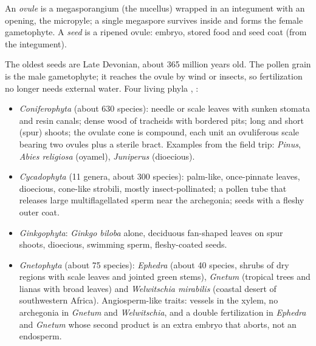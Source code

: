\begin{definition}
\label{definition-ovule}
An \emph{ovule} is a megasporangium (the
nucellus) wrapped in an integument with an
opening, the micropyle; a single megaspore
survives inside and forms the female
gametophyte. A \emph{seed} is a ripened
ovule: embryo, stored food and seed coat
(from the integument).
\end{definition}

The oldest seeds are Late Devonian, about
365 million years old. The pollen grain is
the male gametophyte; it reaches the ovule
by wind or insects, so fertilization no
longer needs external water. Four living
phyla \cite[Chapter 18]{evert2013raven},
\cite[Chapter 12]{singh2010plant}:
\begin{itemize}
\item \emph{Coniferophyta} (about 630
species): needle or scale leaves with sunken
stomata and resin canals; dense wood of
tracheids with bordered pits; long and
short (spur) shoots; the ovulate cone is
compound, each unit an ovuliferous scale
bearing two ovules plus a sterile bract.
Examples from the field trip:
\emph{Pinus}, \emph{Abies religiosa}
(oyamel), \emph{Juniperus} (dioecious).
\item \emph{Cycadophyta} (11 genera, about
300 species): palm-like, once-pinnate
leaves, dioecious, cone-like strobili,
mostly insect-pollinated; a pollen tube
that releases large multiflagellated sperm
near the archegonia; seeds with a fleshy
outer coat.
\item \emph{Ginkgophyta}: \emph{Ginkgo
biloba} alone, deciduous fan-shaped leaves
on spur shoots, dioecious, swimming sperm,
fleshy-coated seeds.
\item \emph{Gnetophyta} (about 75 species):
\emph{Ephedra} (about 40 species, shrubs of
dry regions with scale leaves and jointed
green stems), \emph{Gnetum} (tropical trees
and lianas with broad leaves) and
\emph{Welwitschia mirabilis} (coastal desert
of southwestern Africa). Angiosperm-like
traits: vessels in the xylem, no archegonia
in \emph{Gnetum} and \emph{Welwitschia}, and
a double fertilization in \emph{Ephedra} and
\emph{Gnetum} whose second product is an
extra embryo that aborts, not an endosperm.
\end{itemize}

